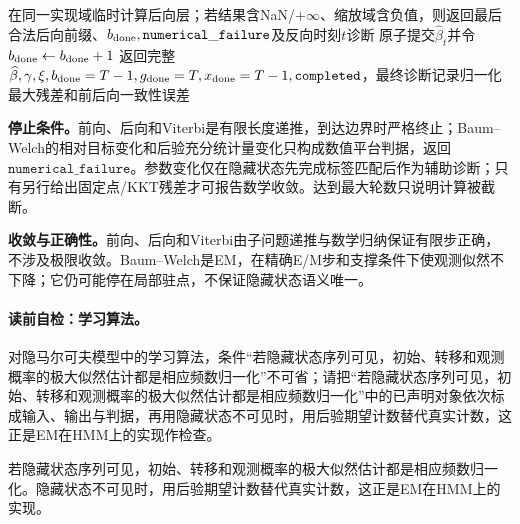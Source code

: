 \begin{AlgorithmContract}
\begin{algorithm}[H]
{  在同一实现域临时计算后向层；若结果含NaN/$+\infty$、缩放域含负值，则返回最后合法后向前缀、$b_{\rm done},\mathtt{numerical\_failure}$及反向时刻$t$诊断\;
  原子提交$\widehat\beta_t$并令$b_{\rm done}\leftarrow b_{\rm done}+1$\;
}
返回完整$\widehat\beta,\gamma,\xi,b_{\rm done}=T-1,g_{\rm done}=T,x_{\rm done}=T-1,\mathtt{completed}$，最终诊断记录归一化最大残差和前后向一致性误差\;
\end{algorithm}
\end{AlgorithmContract}

\label{struct:V3-C05-CH24}
\textbf{停止条件。}前向、后向和Viterbi是有限长度递推，到达边界时严格终止；Baum--Welch的相对目标变化和后验充分统计量变化只构成数值平台判据，返回$\mathtt{numerical\_failure}$。参数变化仅在隐藏状态先完成标签匹配后作为辅助诊断；只有另行给出固定点/KKT残差才可报告数学收敛。达到最大轮数只说明计算被截断。

\label{struct:V3-C05-CH25}
\textbf{收敛与正确性。}前向、后向和Viterbi由子问题递推与数学归纳保证有限步正确，不涉及极限收敛。Baum--Welch是EM，在精确E/M步和支撑条件下使观测似然不下降；它仍可能停在局部驻点，不保证隐藏状态语义唯一。


\paragraph{读前自检：学习算法。}对隐马尔可夫模型中的学习算法，条件“若隐藏状态序列可见，初始、转移和观测概率的极大似然估计都是相应频数归一化”不可省；请把“若隐藏状态序列可见，初始、转移和观测概率的极大似然估计都是相应频数归一化”中的已声明对象依次标成输入、输出与判据，再用隐藏状态不可见时，用后验期望计数替代真实计数，这正是EM在HMM上的实现作检查。\par

若隐藏状态序列可见，初始、转移和观测概率的极大似然估计都是相应频数归一化。隐藏状态不可见时，用后验期望计数替代真实计数，这正是EM在HMM上的实现。

